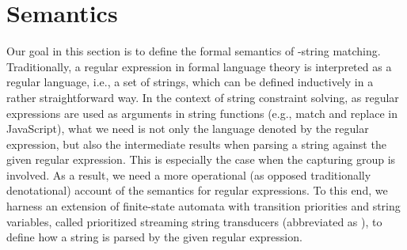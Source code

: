 \section{Semantics}

Our goal in this section is to define the formal semantics of {\regexp}-string matching. 
Traditionally, a regular expression in formal language theory is interpreted as a regular language, i.e., a set of strings, which can be defined inductively in a rather straightforward way. In the context of string constraint solving, as regular expressions are used as arguments in string functions (e.g., {\sf match} and {\sf replace} in JavaScript), %
what we need is not only the language denoted by the regular expression, but also the intermediate results when parsing a string against the given regular expression. This is especially the case when the capturing group is involved. As a result, we need a more operational (as opposed traditionally denotational) account of the semantics for regular expressions. To this end, we harness an extension of finite-state automata with transition priorities and string variables, called prioritized streaming string transducers (abbreviated as \PSST), to define how a string is parsed by the given regular expression. 

